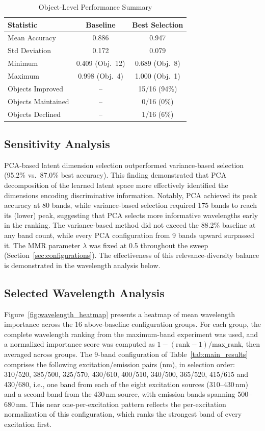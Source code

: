 \begin{table}[!t]
\centering
\caption{Object-Level Performance Summary}
\label{tab:objects}
\begin{tabular}{@{}lcc@{}}
\toprule
\textbf{Statistic} & \textbf{Baseline} & \textbf{Best Selection} \\
\midrule
Mean Accuracy & 0.886 & 0.947 \\
Std Deviation & 0.172 & 0.079 \\
Minimum & 0.409 (Obj.\ 12) & 0.689 (Obj.\ 8) \\
Maximum & 0.998 (Obj.\ 4) & 1.000 (Obj.\ 1) \\
\midrule
Objects Improved & -- & 15/16 (94\%) \\
Objects Maintained & -- & 0/16 (0\%) \\
Objects Declined & -- & 1/16 (6\%) \\
\bottomrule
\end{tabular}
\end{table}


\subsection{Sensitivity Analysis}
\label{sec:results_params}


PCA-based latent dimension selection outperformed variance-based selection (95.2\% vs.\ 87.0\% best accuracy).
This finding demonstrated that PCA decomposition of the learned latent space more effectively identified the dimensions encoding discriminative information.
Notably, PCA achieved its peak accuracy at 80 bands, while variance-based selection required 175 bands to reach its (lower) peak, suggesting that PCA selects more informative wavelengths early in the ranking.
The variance-based method did not exceed the 88.2\% baseline at any band count, while every PCA configuration from 9 bands upward surpassed it.
The MMR parameter $\lambda$ was fixed at 0.5 throughout the sweep (Section~\ref{sec:configurations}).
The effectiveness of this relevance-diversity balance is demonstrated in the wavelength analysis below.

\subsection{Selected Wavelength Analysis}
\label{sec:results_wavelengths}

Figure~\ref{fig:wavelength_heatmap} presents a heatmap of mean wavelength importance across the 16 above-baseline configuration groups.
For each group, the complete wavelength ranking from the maximum-band experiment was used, and a normalized importance score was computed as $1 - (\text{rank} - 1) / \text{max\_rank}$, then averaged across groups. The 9-band configuration of Table~\ref{tab:main_results} comprises the following excitation/emission pairs (nm), in selection order: 310/520, 385/500, 325/570, 430/610, 400/510, 340/500, 365/520, 415/615 and 430/680, i.e., one band from each of the eight excitation sources (310--430\,nm) and a second band from the 430\,nm source, with emission bands spanning 500--680\,nm.
This near one-per-excitation pattern reflects the per-excitation normalization of this configuration, which ranks the strongest band of every excitation first.


